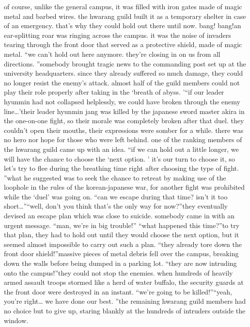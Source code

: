 of course, unlike the general campus, it was filled with iron gates made of magic metal and barbed wires.
 the hwarang guild built it as a temporary shelter in case of an emergency.
that’s why they could hold out there until now.
bang! bang!an ear-splitting roar was ringing across the campus.
 it was the noise of invaders tearing through the front door that served as a protective shield, made of magic metal.
“we can’t hold out here anymore.
 they’re closing in on us from all directions.
”somebody brought tragic news to the commanding post set up at the university headquarters.
since they already suffered so much damage, they could no longer resist the enemy’s attack.
 almost half of the guild members could not play their role properly after taking in the ‘breath of abyss.
’“if our leader hyunmin had not collapsed helplessly, we could have broken through the enemy line…’their leader hyunmin jang was killed by the japanese sword master akira in the one-on-one fight, so their morale was completely broken after that duel.
they couldn’t open their mouths, their expressions were somber for a while.
 there was no hero nor hope for those who were left behind.
one of the ranking members of the hwarang guild came up with an idea.
“if we can hold out a little longer, we will have the chance to choose the ‘next option.
’ it’s our turn to choose it, so let’s try to flee during the breathing time right after choosing the type of fight.
”what he suggested was to seek the chance to retreat by making use of the loophole in the rules of the korean-japanese war, for another fight was prohibited while the ‘duel’ was going on.
“can we escape during that time? isn’t it too short…”“well, don’t you think that’s the only way for now?”they eventually devised an escape plan which was close to suicide.
somebody came in with an urgent message.
“man, we’re in big trouble!”
“what happened this time?”to try that plan, they had to hold out until they would choose the next option, but it seemed almost impossible to carry out such a plan.
“they already tore down the front door shield!”massive pieces of metal debris fell over the campus, breaking down the walls before being dumped in a parking lot.
“they are now intruding onto the campus!”they could not stop the enemies.
 when hundreds of heavily armed assault troops stormed like a herd of water buffalo, the security guards at the front door were destroyed in an instant.
“we’re going to be killed!”“yeah, you’re right… we have done our best.
”the remaining hwarang guild members had no choice but to give up, staring blankly at the hundreds of intruders outside the window.

